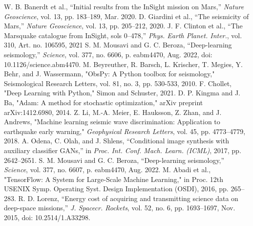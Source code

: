 \documentclass[conference]{IEEEtran}
\begin{document}
\begin{thebibliography}{00}
     W. B. Banerdt et al., ``Initial results from the InSight mission on Mars,'' \emph{Nature Geoscience}, vol. 13, pp. 183--189, Mar. 2020.
     D. Giardini et al., ``The seismicity of Mars,'' \emph{Nature Geoscience}, vol. 13, pp. 205--212, 2020.
     J. F. Clinton et al., ``The Marsquake catalogue from InSight, sols 0--478,'' \emph{Phys. Earth Planet. Inter.}, vol. 310, Art. no. 106595, 2021
     S. M. Mousavi and G. C. Beroza, ``Deep-learning seismology,'' \emph{Science}, vol. 377, no. 6606, p. eabm4470, Aug. 2022, doi: 10.1126/science.abm4470.   
     M. Beyreuther, R. Barsch, L. Krischer, T. Megies, Y. Behr, and J. Wassermann, "ObsPy: A Python toolbox for seismology," Seismological Research Letters, vol. 81, no. 3, pp. 530-533, 2010.
     F. Chollet, "Deep Learning with Python," Simon and Schuster, 2021.
     D. P. Kingma and J. Ba, "Adam: A method for stochastic optimization," arXiv preprint arXiv:1412.6980, 2014.
     Z. Li, M.-A. Meier, E. Hauksson, Z. Zhan, and J. Andrews, "Machine learning seismic wave discrimination: Application to earthquake early warning," \emph{Geophysical Research Letters}, vol. 45, pp. 4773–4779, 2018.
     A. Odena, C. Olah, and J. Shlens, ``Conditional image synthesis with auxiliary classifier GANs,'' in \emph{Proc. Int. Conf. Mach. Learn. (ICML)}, 2017, pp. 2642--2651.
     S. M. Mousavi and G. C. Beroza, ``Deep-learning seismology,'' \emph{Science}, vol. 377, no. 6607, p. eabm4470, Aug. 2022.   %
     M. Abadi et al., "TensorFlow: A System for Large-Scale Machine Learning," in Proc. 12th USENIX Symp. Operating Syst. Design Implementation (OSDI), 2016, pp. 265--283.
     R. D. Lorenz, ``Energy cost of acquiring and transmitting science data on deep-space missions,'' \emph{J. Spacecr. Rockets}, vol. 52, no. 6, pp. 1693--1697, Nov. 2015, doi: 10.2514/1.A33298.

\end{thebibliography}
\end{document}
